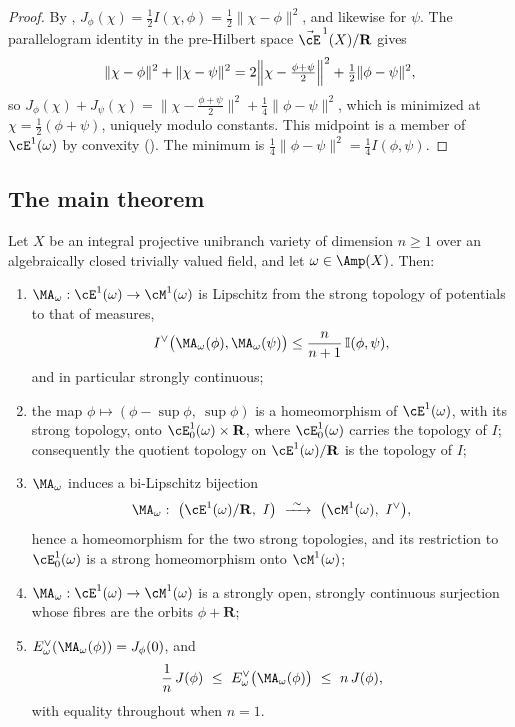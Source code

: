 \begin{proof}
By , $J_\phi(\chi)=\tfrac12I(\chi,\phi)
=\tfrac12\lVert\chi-\phi\rVert^2$, and likewise for $\psi$.  The
parallelogram identity in the pre-Hilbert space
$\vec\cE^{\,1}(X)/\mathbf R$ gives
\[
 \lVert\chi-\phi\rVert^2+\lVert\chi-\psi\rVert^2
 =2\Bigl\lVert\chi-\tfrac{\phi+\psi}2\Bigr\rVert^2
   +\tfrac12\lVert\phi-\psi\rVert^2 ,
\]
so $J_\phi(\chi)+J_\psi(\chi)
=\lVert\chi-\tfrac{\phi+\psi}2\rVert^2+\tfrac14\lVert\phi-\psi\rVert^2$,
which is minimized at $\chi=\tfrac12(\phi+\psi)$, uniquely modulo
constants. This midpoint is a member of
$\cE^1(\omega)$ by convexity ().  The minimum is
$\tfrac14\lVert\phi-\psi\rVert^2=\tfrac14I(\phi,\psi)$.
\end{proof}

\subsection{The main theorem}
\label{sec:ch48-main-theorem}

\begin{theorem}
\label{thm:ch48-ma-homeomorphism}
Let $X$ be an integral projective unibranch variety of dimension $n\ge1$
over an algebraically closed trivially valued field, and let
$\omega\in\Amp(X)$.  Then:
\begin{enumerate}
\item\label{itm:ch48-ma:lip}
      $\MA_\omega:\cE^1(\omega)\to\cM^1(\omega)$ is Lipschitz from the
      strong topology of potentials to that of measures,
      \[
       I^\vee\bigl(\MA_\omega(\phi),\MA_\omega(\psi)\bigr)
       \le\frac n{n+1}\,\mathbb I(\phi,\psi),
      \]
      and in particular strongly continuous;
\item\label{itm:ch48-ma:split}
      the map $\phi\mapsto(\phi-\sup\phi,\ \sup\phi)$ is a homeomorphism
      of $\cE^1(\omega)$, with its strong topology, onto
      $\cE^1_0(\omega)\times\mathbf R$, where $\cE^1_0(\omega)$ carries
      the topology of $I$; consequently the quotient topology on
      $\cE^1(\omega)/\mathbf R$ is the topology of $I$;
\item\label{itm:ch48-ma:homeo}
      $\MA_\omega$ induces a bi-Lipschitz bijection
      \[
       \MA_\omega:\ \bigl(\cE^1(\omega)/\mathbf R,\ I\bigr)
       \ \xrightarrow{\ \sim\ }\ \bigl(\cM^1(\omega),\ I^\vee\bigr),
      \]
      hence a homeomorphism for the two strong topologies, and its
      restriction to $\cE^1_0(\omega)$ is a strong homeomorphism onto
      $\cM^1(\omega)$;
\item\label{itm:ch48-ma:open}
      $\MA_\omega:\cE^1(\omega)\to\cM^1(\omega)$ is a strongly open,
      strongly continuous surjection whose fibres are the orbits
      $\phi+\mathbf R$;
\item\label{itm:ch48-ma:energy}
      $E^\vee_\omega(\MA_\omega(\phi))=J_\phi(0)$, and
      \[
       \frac1n\,J(\phi)\ \le\ E^\vee_\omega\bigl(\MA_\omega(\phi)\bigr)
       \ \le\ n\,J(\phi),
      \]
      with equality throughout when $n=1$.
\end{enumerate}
\end{theorem}

